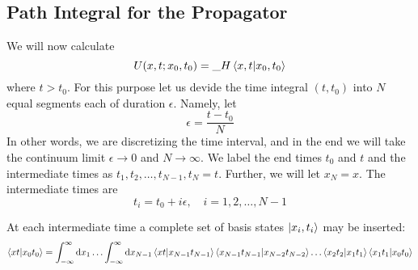 \begin{enumerate}
	\section{Path Integral for the Propagator}
		We will now calculate
		\begin{equation}
			U(x,t;x_0, t_0) = {\_H}\braket{x,t}{x_0, t_0}
			\label{chapter12.eqn1-propagator-path-integral}
		\end{equation}
		where $t>t_0$. For this purpose let us devide the time integral $(t,t_0)$ into $N$ equal segments each of duration $\epsilon$. Namely, let
		\begin{equation}
			\epsilon = \frac{t-t_0}{N}
			\label{chapter12.eqn2-propagator-path-integral}
		\end{equation}
		In other words, we are discretizing the time interval, and in the end we will take the continuum limit $\epsilon\rightarrow 0$ and $N\rightarrow \infty$. We label the end times $t_0$ and $t$ and the intermediate times as $t_1, t_2, \ldots, t_{N-1}, t_N=t$. Further, we will let $x_N=x$. The intermediate times are 
		\begin{equation}
			t_i=t_0+i \epsilon, \quad i=1,2,\ldots,N-1
			\label{chapter12.eqn3-propagator-path-integral}
		\end{equation}
		
		At each intermediate time a complete set of basis states $\ket{x_i,t_i}$ may be inserted:
		\begin{equation}
			\braket{x t}{x_0 t_0} =\int_{-\infty}^{\infty}\dd{x_1} \ldots \int_{-\infty}^{\infty} \dd{x_{N-1}} \braket{x t}{x_{N-1} t_{N-1}}\braket{x_{N-1} t_{N-1}}{x_{N-2} t_{N-2}} \ldots \braket{x_2 t_2}{x_{1} t_{1}} \braket{x_1 t_1}{x_{0} t_{0}}
			\label{chapter12.eqn4-propagator-path-integral}
		\end{equation}
		

\end{enumerate}
